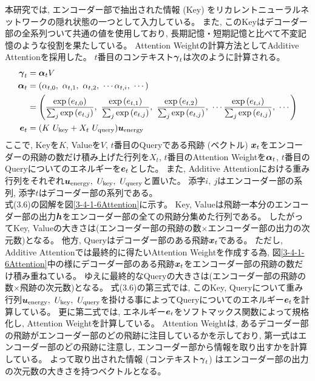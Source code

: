 本研究では, エンコーダー部で抽出された情報 (Key) をリカレントニューラルネットワークの隠れ状態の一つとして入力している。
また, このKeyはデコーダー部の全系列ついて共通の値を使用しており, 長期記憶・短期記憶と比べて不変記憶のような役割を果たしている。
Attention Weightの計算方法としてAdditive Attentionを採用した。
$t$番目のコンテキスト${\mbox{\boldmath{$\gamma$}}}_{t}$は次のように計算される。
\begin{equation}
 \begin{split}
  {\mbox{\boldmath{$\gamma$}}}_{t} 
  &= {\mbox{\boldmath{$\alpha$}}}_{t} V\\
  {\mbox{\boldmath{$\alpha$}}}_{t}
  &= (\alpha_{t,0},\ \alpha_{t,1},\ \alpha_{t,2},\ \cdots \alpha_{t,i},\ \cdots) \\
  &= \left(\frac{\exp{({{e}}_{t,0})}}{\sum_j \exp{({{e}}_{t,j})}},\ \frac{\exp{({{e}}_{t,1})}}{\sum_j \exp{({{e}}_{t,j})}},\ \frac{\exp{({{e}}_{t,2})}}{\sum_j \exp{({{e}}_{t,j})}},\  \cdots \frac{\exp{({{e}}_{t,i})}}{\sum_j \exp{({{e}}_{t,j})}},\ \cdots\right)\\
  {\mbox{\boldmath{$e$}}}_{t}
  &=(K\ U_{\rm key} + X_t\ U_{\rm query}) {\mbox{\boldmath{$u$}}}_{\rm energy} \\
 \end{split}
\end{equation}
ここで, Keyを$K$, Valueを$V$, $t$番目のQueryである飛跡 (ベクトル) ${\mbox{\boldmath{$x$}}}_{t}$をエンコーダーの飛跡の数だけ積み上げた行列を$X_t$, $t$番目のAttention Weightを${\mbox{\boldmath{$\alpha$}}}_{t}$, $t$番目のQueryについてのエネルギーを${\mbox{\boldmath{$e$}}}_{t}$とした。
また, Additive Attentionにおける重み行列をそれぞれ${\mbox{\boldmath{$u$}}}_{\rm energy},\  U_{\rm key},\ U_{\rm query}$と置いた。
添字$i,\ j$はエンコーダー部の系列, 添字$t$はデコーダー部の系列である。\\

式(3.6)の図解を図\ref{3-4-1-6Attention}に示す。
Key, Valueは飛跡一本分のエンコーダー部の出力${\mbox{\boldmath{$h$}}}$をエンコーダー部の全ての飛跡分集めた行列である。
したがってKey, Valueの大きさは(エンコーダー部の飛跡の数$\times$エンコーダー部の出力の次元数)となる。
他方, Queryはデコーダー部のある飛跡${\mbox{\boldmath{$x$}}}_{t}$である。
ただし, Additive Attentionでは最終的に得たいAttention Weightを作成する為, 図\ref{3-4-1-6Attention}中の様にデコーダー部のある飛跡${\mbox{\boldmath{$x$}}}_{t}$をエンコーダー部の飛跡の数だけ積み重ねている。
ゆえに最終的なQueryの大きさは(エンコーダー部の飛跡の数$\times$飛跡の次元数)となる。
式(3.6)の第三式では, このKey, Queryについて重み行列${\mbox{\boldmath{$u$}}}_{\rm energy},\  U_{\rm key},\ U_{\rm query}$を掛ける事によってQueryについてのエネルギー${\mbox{\boldmath{$e$}}}_{t}$を計算している。
更に第二式では, エネルギー${\mbox{\boldmath{$e$}}}_{t}$をソフトマックス関数によって規格化し, Attention Weightを計算している。
Attention Weightは, あるデコーダー部の飛跡がエンコーダー部のどの飛跡に注目しているかを示しており, 第一式はエンコーダー部のどの飛跡に注意し, エンコーダー部から情報を取り出すかを計算している。
よって取り出された情報 (コンテキスト${\mbox{\boldmath{$\gamma$}}}_{t}$) はエンコーダー部の出力の次元数の大きさを持つベクトルとなる。

